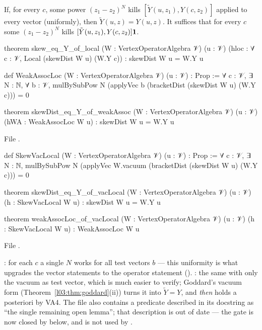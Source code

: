 \begin{proposition}\label{l03:prop:skewred}
If, for every $c$, some power $(z_1-z_2)^N$ kills $[\tilde Y(u,z_1),Y(c,z_2)]$ applied to every
vector (uniformly), then $\tilde Y(u,z) = Y(u,z)$. It suffices that for every $c$ some
$(z_1-z_2)^N$ kills $[\tilde Y(u,z_1),Y(c,z_2)]\mathbf{1}$.
\end{proposition}
\begin{leancode}
theorem skew_eq_Y_of_local (W : VertexOperatorAlgebra 𝒱) (u : 𝒱)
    (hloc : ∀ c : 𝒱, Local (skewDist W u) (W.Y c)) :
    skewDist W u = W.Y u

def WeakAssocLoc (W : VertexOperatorAlgebra 𝒱) (u : 𝒱) : Prop :=
  ∀ c : 𝒱, ∃ N : ℕ, ∀ b : 𝒱,
    mulBySubPow N (applyVec b (bracketDist (skewDist W u) (W.Y c))) = 0

theorem skewDist_eq_Y_of_weakAssoc (W : VertexOperatorAlgebra 𝒱) (u : 𝒱)
    (hWA : WeakAssocLoc W u) :
    skewDist W u = W.Y u
\end{leancode}
File .
\begin{leancode}
def SkewVacLocal (W : VertexOperatorAlgebra 𝒱) (u : 𝒱) : Prop :=
  ∀ c : 𝒱, ∃ N : ℕ,
    mulBySubPow N (applyVec W.vacuum (bracketDist (skewDist W u) (W.Y c))) = 0

theorem skewDist_eq_Y_of_vacLocal (W : VertexOperatorAlgebra 𝒱) (u : 𝒱)
    (h : SkewVacLocal W u) : skewDist W u = W.Y u

theorem weakAssocLoc_of_vacLocal (W : VertexOperatorAlgebra 𝒱) (u : 𝒱)
    (h : SkewVacLocal W u) : WeakAssocLoc W u
\end{leancode}
File .

\begin{dictionary}
: for each $c$ a single $N$ works for all test vectors $b$ --- this
uniformity is what upgrades the vector statements to the operator statement 
(). : the same with only the vacuum as
test vector, which is much easier to verify; Goddard's vacuum form
(Theorem~\ref{l03:thm:goddard}(ii)) turns it into $\tilde Y = Y$, and \emph{then}
 holds a posteriori by VA4. The file  also contains a
predicate  described in its docstring as ``the single remaining open lemma''; that
description is out of date --- the gate is now closed by  below, and
 is not used by .
\end{dictionary}

